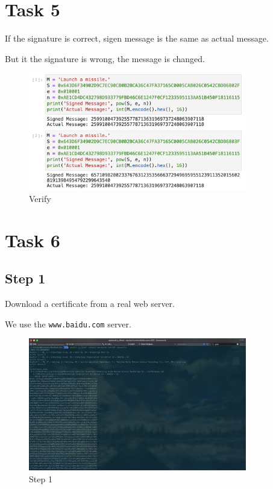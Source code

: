 \documentclass[onecolumn,oneside]{SUSTechHomework}
\begin{document}
  \section*{Task 5}

  If the signature is correct, sigen message is the same as actual message.

  But it the signature is wrong, the message is changed.

  \begin{figure}[H]
    \centering
    \includegraphics[width=0.85\textwidth]{img/task5_1.png}
    \caption{Verify}
  \end{figure}

  \section*{Task 6}

  \subsection*{Step 1}
  
  Download a certificate from a real web server.

  We use the \verb|www.baidu.com| server.

  \begin{figure}[H]
    \centering
    \includegraphics[width=0.85\textwidth]{img/task6_1.png}
    \caption{Step 1}
  \end{figure}
\end{document}
